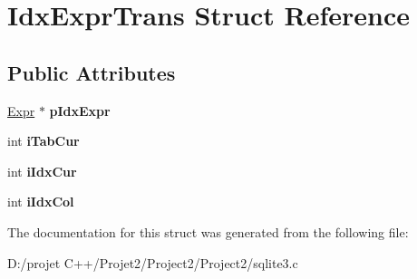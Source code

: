 \hypertarget{struct_idx_expr_trans}{}\section{Idx\+Expr\+Trans Struct Reference}
\label{struct_idx_expr_trans}
\subsection*{Public Attributes}
\begin{DoxyCompactItemize}
\item 
\mbox{\label{struct_idx_expr_trans_aad1ac82821587a903b325e7a3c41b9f8}} 
\mbox{\hyperlink{struct_expr}{Expr}} $\ast$ {\bfseries p\+Idx\+Expr}
\item 
\mbox{\label{struct_idx_expr_trans_afa7174674b23ddeaac54bb7eb24f2ffd}} 
int {\bfseries i\+Tab\+Cur}
\item 
\mbox{\label{struct_idx_expr_trans_a4ada73eae908aab2357d21285cf57a1f}} 
int {\bfseries i\+Idx\+Cur}
\item 
\mbox{\label{struct_idx_expr_trans_a77adde7e18ae779eda583eee8335ca4d}} 
int {\bfseries i\+Idx\+Col}
\end{DoxyCompactItemize}


The documentation for this struct was generated from the following file\+:\begin{DoxyCompactItemize}
\item 
D\+:/projet C++/\+Projet2/\+Project2/\+Project2/sqlite3.\+c\end{DoxyCompactItemize}
